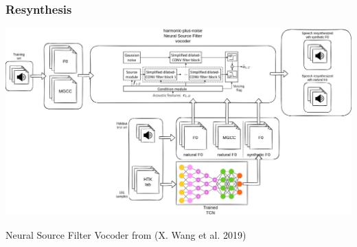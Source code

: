 \documentclass[a4paper,9pt]{beamer}
\theoremstyle{mytheoremstyle}
\begin{document}
\begin{frame}
\frametitle{Resynthesis}
\begin{center}
  \includegraphics[width=\textwidth]{res/resynthesis}
\end{center}
\scriptsize{
\begin{block}{}
Neural Source Filter Vocoder from (X. Wang et al. 2019)
\end{block}
}
\end{frame}
\end{document}
